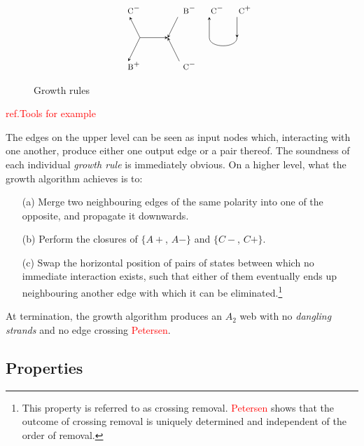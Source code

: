 \documentclass[nonatbib,numbers,10pt]{sigplanconf}
\newcommand\todo[1]{\textcolor{red}{#1}}
\begin{document}
\begin{figure}[htbp!]
\[\begin{tikzpicture}
\node (i33) at (7,-5) {$\textsc{\small C}^-$};
\node (ii33) at (9,-5) {$\textsc{\small B}^-$};
\node (d33) at (7.5,-6) {};
\node (dd33) at (8.5,-6) {};
\node (o33) at (7,-7) {$\textsc{\small B}^+$};
\node (oo33) at (9,-7) {$\textsc{\small C}^-$};
\draw[<-,>=stealth] (i33) -- (d33.center);
\draw[->,>=stealth] (ii33) -- (dd33.center);
\draw[->,>=stealth] (d33.center) -- (dd33.center);
\draw[->,>=stealth, shorten >=5pt] (d33.center) -- (o33.center);
\draw[<-,>=stealth, shorten >=5pt] (dd33.center) -- (oo33.center);

\node (i34) at (10,-5) {$\textsc{\small C}^-$};
\node (ii34) at (11,-5) {$\textsc{\small C}^+$};
\node (d34) at (10,-6) {};
\node (dd34) at (11,-6) {};
\draw[<-,>=stealth] (i34) -- (d34.center);
\draw[->,>=stealth] (ii34) -- (dd34.center);
\draw (d34.center) edge [-,>=stealth,bend right=90] (dd34.center);

\end{tikzpicture}
\]
\caption{Growth rules}
\end{figure}



\todo{ref.Tools for example}


The edges on the upper level can be seen as input nodes which, interacting with one another, produce either one output edge or a pair thereof. The soundness of each individual \textit{growth rule} is immediately obvious. On a higher level, what the growth algorithm achieves is to:
\begin{enumerate}
\item[(a)] Merge two neighbouring edges of the same polarity into one of the opposite, and propagate it downwards.
\item[(b)] Perform the closures of $\{A+$, $A-\}$ and $\{C-$, $C+\}$.
\item[(c)] Swap the horizontal position of pairs of states between which no immediate interaction exists, such that either of them eventually ends up neighbouring another edge with which it can be eliminated.\footnote{This property is referred to as crossing removal. \todo{Petersen} shows that the outcome of crossing removal is uniquely determined and independent of the order of removal.}
\end{enumerate}

At termination, the growth algorithm produces an $A_2$ web with no \textit{dangling strands} and no edge crossing \todo{Petersen}.
\subsection{Properties}
\end{document}
